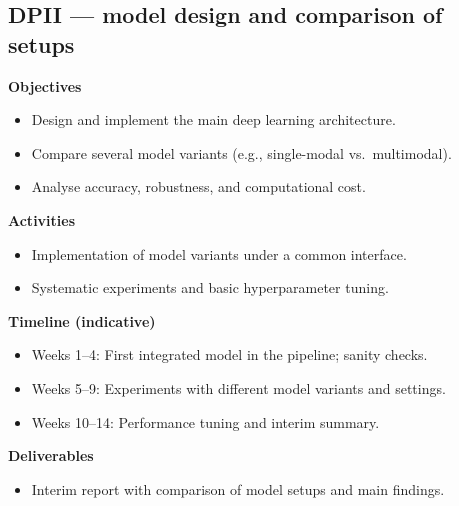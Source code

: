 \documentclass[12pt,a4paper]{report}
\begin{document}
\subsection*{DPII — model design and comparison of setups}
\textbf{Objectives}
\begin{itemize}
  \item Design and implement the main deep learning architecture.
  \item Compare several model variants (e.g., single-modal vs.\ multimodal).
  \item Analyse accuracy, robustness, and computational cost.
\end{itemize}
\textbf{Activities}
\begin{itemize}
  \item Implementation of model variants under a common interface.
  \item Systematic experiments and basic hyperparameter tuning.
\end{itemize}
\textbf{Timeline (indicative)}
\begin{itemize}
  \item Weeks 1--4: First integrated model in the pipeline; sanity checks.
  \item Weeks 5--9: Experiments with different model variants and settings.
  \item Weeks 10--14: Performance tuning and interim summary.
\end{itemize}
\textbf{Deliverables}
\begin{itemize}
  \item Interim report with comparison of model setups and main findings.
\end{itemize}
\end{document}

